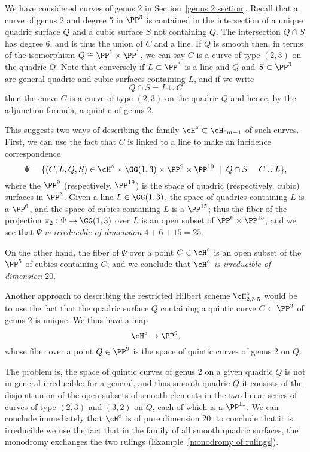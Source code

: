 We have considered curves of genus 2 in Section~\ref{genus 2 section}.  Recall that a curve of genus 2 and degree 5 in 
$\PP^3$ is contained in the intersection of a unique quadric surface $Q$ and a cubic surface $S$ not containing $Q$.
The intersection $Q\cap S$
has degree 6, and is thus the union of $C$ and a line. If $Q$ is smooth then, in terms of the isomorphism $Q \cong \PP^1 \times \PP^1$, we can say $C$ is a curve of type $(2,3)$ on the quadric $Q$. Note that conversely if $L \subset \PP^3$ is a line and $Q$ and $S \subset \PP^3$ are general quadric and cubic surfaces containing $L$, and if we write
$$
Q \cap S = L \cup C
$$ 
then the curve $C$ is a curve of type $(2,3)$ on the quadric $Q$ and hence, by the adjunction formula,
 a quintic of genus 2.

This suggests two ways of describing the family $\cH^\circ \subset \cH_{5m-1}$ of such curves. First, we can use the fact that $C$ is linked to a line to make an incidence correspondence
$$
\Psi = \{ (C, L, Q, S) \in \cH^\circ \times \GG(1,3) \times \PP^9 \times \PP^{19} \; \mid \; Q \cap S = C \cup L \},
$$
where the $\PP^9$ (respectively, $\PP^{19}$) is the space of quadric (respectively, cubic) surfaces in $\PP^3$. Given a line $L \in \GG(1,3)$, the space of quadrics containing $L$ is a $\PP^6$, and the space of cubics containing $L$ is a $\PP^{15}$; thus the fiber of the projection $\pi_2 : \Psi \to \GG(1,3)$ over $L$ is an open subset of $\PP^6 \times \PP^{15}$, and we see that \emph{$\Psi$ is irreducible of dimension $4 + 6 + 15 = 25$}.

On the other hand, the fiber of $\Psi$ over a point $C \in \cH^\circ$ is an open subset of the $\PP^5$ of cubics containing $C$; and we conclude that \emph{$\cH^\circ$ is irreducible of dimension $20$}.


Another approach to describing the restricted Hilbert scheme $\cH^\circ_{2,3,5}$ would be to use the fact that the quadric surface $Q$ containing a quintic curve $C \subset \PP^3$ of genus 2 is unique. We thus have a map
$$
\cH^\circ \to \PP^9,
$$
whose fiber over a point $Q \in \PP^9$ is the space of quintic curves of genus 2 on $Q$. 

The problem is, the space of quintic curves of genus 2 on a given quadric $Q$ is not in general irreducible: for a general, and thus smooth quadric $Q$ it consists of the disjoint union of the open subsets of smooth elements in the two linear series of curves of type $(2,3)$ and $(3,2)$ on $Q$, each of which is a $\PP^{11}$. We can conclude immediately that $\cH^\circ$ is of pure dimension 20; to conclude that it is irreducible we use the fact that in the family of all smooth quadric surfaces, the monodromy exchanges the two rulings (Example~\ref{monodromy of rulings}).

